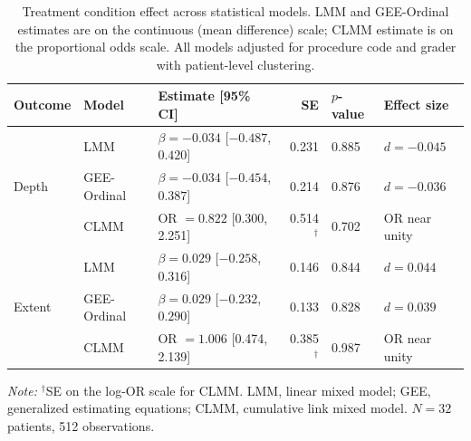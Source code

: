 \begin{table}[htbp]
\centering
\caption{Treatment condition effect across statistical models. LMM and GEE-Ordinal estimates are on the continuous (mean difference) scale; CLMM estimate is on the proportional odds scale. All models adjusted for procedure code and grader with patient-level clustering.}
\label{tab:model-comparison}
\begin{tabular}{l l l r l l}
\toprule
{Outcome} & {Model} & {Estimate [95\% CI]} & {SE} & {$p$-value} & {Effect size} \\
\midrule
\multirow{3}{*}{Depth}
  & LMM         & $\beta = -0.034$ [$-0.487$, $0.420$] & 0.231 & 0.885 & $d = -0.045$ \\
  & GEE-Ordinal & $\beta = -0.034$ [$-0.454$, $0.387$] & 0.214 & 0.876 & $d = -0.036$ \\
  & CLMM        & OR $= 0.822$ [0.300, 2.251]           & 0.514$^{\dagger}$ & 0.702 & OR near unity \\
\midrule
\multirow{3}{*}{Extent}
  & LMM         & $\beta = 0.029$ [$-0.258$, $0.316$] & 0.146 & 0.844 & $d = 0.044$ \\
  & GEE-Ordinal & $\beta = 0.029$ [$-0.232$, $0.290$] & 0.133 & 0.828 & $d = 0.039$ \\
  & CLMM        & OR $= 1.006$ [0.474, 2.139]          & 0.385$^{\dagger}$ & 0.987 & OR near unity \\
\bottomrule
\end{tabular}
\smallskip

\noindent\textit{Note:} $^{\dagger}$SE on the log-OR scale for CLMM. LMM, linear mixed model; GEE, generalized estimating equations; CLMM, cumulative link mixed model. $N = 32$ patients, 512 observations.
\end{table}
